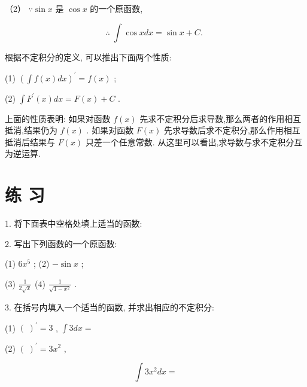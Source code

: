 \documentclass[10pt]{article}
\begin{document}
（2） \(\because \sin x\) 是 \(\cos x\) 的一个原函数,

\[
\therefore \;\int \cos {xdx} = \sin x + C\text{. }
\]

根据不定积分的定义, 可以推出下面两个性质:

(1) \({\left( \int f\left( x\right) dx\right) }^{\prime } = f\left( x\right)\) ;

(2) \(\int {F}^{\prime }\left( x\right) {dx} = F\left( x\right) + C\) .

上面的性质表明: 如果对函数 \(f\left( x\right)\) 先求不定积分后求导数,那么两者的作用相互抵消,结果仍为 \(f\left( x\right)\) . 如果对函数 \(F\left( x\right)\) 先求导数后求不定积分,那么作用相互抵消后结果与 \(F\left( x\right)\) 只差一个任意常数. 从这里可以看出,求导数与求不定积分互为逆运算.

\section*{练 习}

1. 将下面表中空格处填上适当的函数:

\begin{center}
\end{center}

2. 写出下列函数的一个原函数:

(1) \(6{x}^{5}\) ; (2) \(- \sin x\) ;

(3) \(\frac{1}{2\sqrt{x}}\) (4) \(\frac{1}{\sqrt{1 - {x}^{2}}}\) .

3. 在括号内填入一个适当的函数, 并求出相应的不定积分:

(1) \({\left( \;\right) }^{\prime } = 3\) , \(\int {3dx} =\)

(2) \({\left( \;\right) }^{\prime } = 3{x}^{2}\) ,

\[
\int 3{x}^{2}{dx} =
\]
\end{document}
